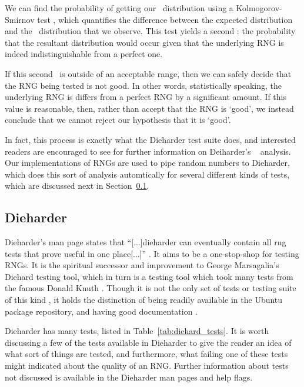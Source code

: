 We can find the probability of getting our \pvalue~distribution using a Kolmogorov-Smirnov test \cite{Kolmogorov_Smirnov}, which quantifies the difference between the expected distribution and the \pvalue~distribution that we observe. This test yields a second \pvalue: the probability that the resultant distribution would occur given that the underlying RNG is indeed indistinguishable from a perfect one.

If this second \pvalue~is outside of an acceptable range, then we can safely decide that the RNG being tested is not good. In other words, statistically speaking, the underlying RNG is differs from a perfect RNG by a significant amount. If this value is reasonable, then, rather than accept that the RNG is `good', we instead conclude that we cannot reject our hypothesis that it is `good'.

In fact, this process is exactly what the Dieharder test suite does, and interested readers are encouraged to see \cite{dieharder_manual} for further information on Deiharder's \pvalue~ analysis. Our implementations of RNGs are used to pipe random numbers to Dieharder, which does this sort of analysis automtically for several different kinds of tests, which are discussed next in Section~\ref{sec:dieharder}.

\subsection{Dieharder}
\label{sec:dieharder}

Dieharder's man page states that ``[...]dieharder can eventually contain all rng tests that prove useful in one place[...]'' \cite{dieharder_website}. It aims to be a one-stop-shop for testing RNGs. It is the spiritual successor and improvement to George Marsagalia's Diehard testing tool, which in turn is a testing tool which took many tests from the famous Donald Knuth \cite{diehard}. Though it is not the only set of tests or testing suite of this kind \cite{donald1999art,diehard,nisttoolkit,L'Ecuyer:2007:TCL:1268776.1268777}, it holds the distinction of being readily available in the Ubuntu package repository, and having good documentation \cite{dieharder_manual}.

Dieharder has many tests, listed in Table~\ref{tab:diehard_tests}. It is worth discussing a few of the tests available in Dieharder to give the reader an idea of what sort of things are tested, and furthermore, what failing one of these tests might indicated about the quality of an RNG. Further information about tests not discussed is available in the Dieharder man pages and help flags.

